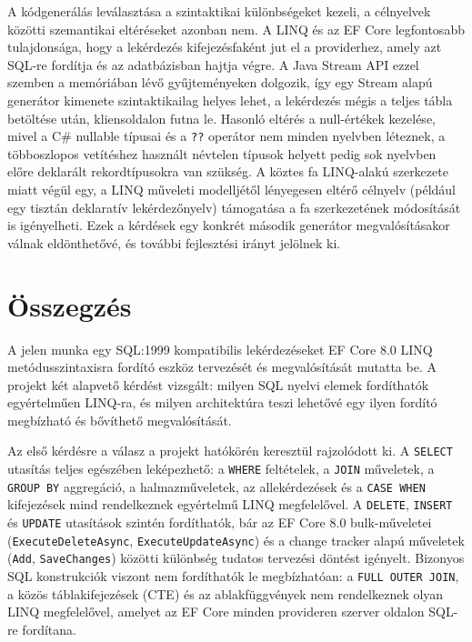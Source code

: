 \documentclass[a4paper,12pt]{article}
\begin{document}
A kódgenerálás leválasztása a szintaktikai különbségeket kezeli, a célnyelvek közötti szemantikai eltéréseket azonban nem. A LINQ és az EF Core legfontosabb tulajdonsága, hogy a lekérdezés kifejezésfaként jut el a providerhez, amely azt SQL-re fordítja és az adatbázisban hajtja végre. A Java Stream API ezzel szemben a memóriában lévő gyűjteményeken dolgozik, így egy Stream alapú generátor kimenete szintaktikailag helyes lehet, a lekérdezés mégis a teljes tábla betöltése után, kliensoldalon futna le. Hasonló eltérés a null-értékek kezelése, mivel a C\# nullable típusai és a \texttt{??} operátor nem minden nyelvben léteznek, a többoszlopos vetítéshez használt névtelen típusok helyett pedig sok nyelvben előre deklarált rekordtípusokra van szükség. A köztes fa LINQ-alakú szerkezete miatt végül egy, a LINQ műveleti modelljétől lényegesen eltérő célnyelv (például egy tisztán deklaratív lekérdezőnyelv) támogatása a fa szerkezetének módosítását is igényelheti. Ezek a kérdések egy konkrét második generátor megvalósításakor válnak eldönthetővé, és további fejlesztési irányt jelölnek ki.

\section{Összegzés}

A jelen munka egy SQL:1999 kompatibilis lekérdezéseket EF Core 8.0 LINQ metódusszintaxisra fordító eszköz tervezését és megvalósítását mutatta be. A projekt két alapvető kérdést vizsgált: milyen SQL nyelvi elemek fordíthatók egyértelműen LINQ-ra, és milyen architektúra teszi lehetővé egy ilyen fordító megbízható és bővíthető megvalósítását.

Az első kérdésre a válasz a projekt hatókörén keresztül rajzolódott ki. A \texttt{SELECT} utasítás teljes egészében leképezhető: a \texttt{WHERE} feltételek, a \texttt{JOIN} műveletek, a \texttt{GROUP BY} aggregáció, a halmazműveletek, az allekérdezések és a \texttt{CASE WHEN} kifejezések mind rendelkeznek egyértelmű LINQ megfelelővel. A \texttt{DELETE}, \texttt{INSERT} és \texttt{UPDATE} utasítások szintén fordíthatók, bár az EF Core 8.0 bulk-műveletei (\texttt{ExecuteDeleteAsync}, \texttt{ExecuteUpdateAsync}) és a change tracker alapú műveletek (\texttt{Add}, \texttt{SaveChanges}) közötti különbség tudatos tervezési döntést igényelt. Bizonyos SQL konstrukciók viszont nem fordíthatók le megbízhatóan: a \texttt{FULL OUTER JOIN}, a közös táblakifejezések (CTE) és az ablakfüggvények nem rendelkeznek olyan LINQ megfelelővel, amelyet az EF Core minden provideren szerver oldalon SQL-re fordítana.
\end{document}
